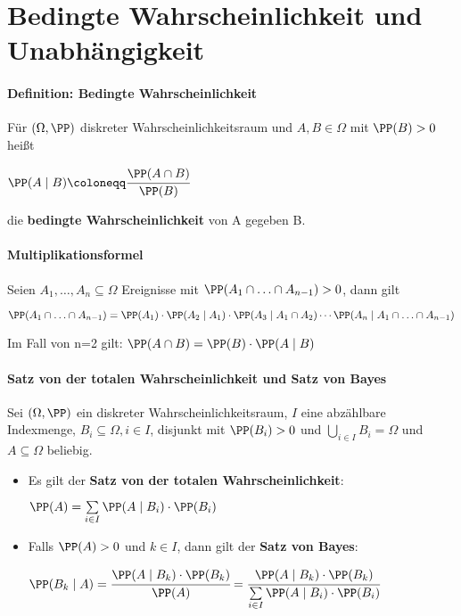 \section{Bedingte Wahrscheinlichkeit und Unabhängigkeit}
\paragraph{Definition: Bedingte Wahrscheinlichkeit}
Für $(\Omega,\PP)$ diskreter Wahrscheinlichkeitsraum und $A,B\in\Omega$ mit $\PP(B)>0$ heißt
\begin{tightcenter}
	$\PP(A\mid B)\coloneqq\cfrac{\PP(A\cap B)}{\PP(B)}$
\end{tightcenter}
die \textbf{bedingte Wahrscheinlichkeit} von A gegeben B.

\paragraph{Multiplikationsformel}
Seien $A_1,\ldots,A_n\subseteq\Omega$ Ereignisse mit $\PP(A_1\cap\ldots\cap A_{n-1})>0$, dann gilt
\begin{tightcenter}
	$\PP(A_1\cap\ldots\cap A_{n-1})=\PP(A_1)\cdot\PP(A_2\mid A_1)\cdot\PP(A_3\mid A_1\cap A_2)\cdots\PP(A_n\mid A_1\cap\ldots\cap A_{n-1})$
\end{tightcenter}
Im Fall von n=2 gilt: $\PP(A\cap B)=\PP(B)\cdot\PP(A\mid B)$

\paragraph{Satz von der totalen Wahrscheinlichkeit und Satz von Bayes}
Sei $(\Omega,\PP)$ ein diskreter Wahrscheinlichkeitsraum, $I$ eine abzählbare Indexmenge, $B_i\subseteq\Omega, i\in I$, disjunkt mit $\PP(B_i)>0$ und $\bigcup\limits_{i\in I}B_i=\Omega$ und $A\subseteq\Omega$ beliebig.
\begin{itemize}
	\item Es gilt der \textbf{Satz von der totalen Wahrscheinlichkeit}:
	\begin{tightcenter}
		$\PP(A)=\sum\limits_{i\in I}\PP(A\mid B_i)\cdot\PP(B_i)$
	\end{tightcenter}
	\item Falls $\PP(A)>0$ und $k\in I$, dann gilt der \textbf{Satz von Bayes}:
	\begin{tightcenter}
		$\PP(B_k\mid A)=\cfrac{\PP(A\mid B_k)\cdot\PP(B_k)}{\PP(A)}=\cfrac{\PP(A\mid B_k)\cdot\PP(B_k)}{\sum\limits_{i\in I}\PP(A\mid B_i)\cdot\PP(B_i)}$
	\end{tightcenter}
\end{itemize}

